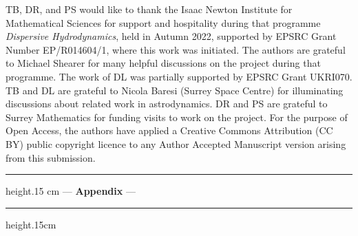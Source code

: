\documentclass[10pt]{article}
\begin{document}
TB, DR, and PS would like to thank the Isaac Newton Institute for Mathematical Sciences for support and hospitality during that programme {\it Dispersive Hydrodynamics}, held in Autumn 2022, supported by EPSRC Grant Number EP/R014604/1, where this work was initiated. The authors are grateful to Michael Shearer for many helpful discussions on the project during that programme.  The work of DL was partially supported by EPSRC Grant UKRI070. TB and DL are grateful to Nicola Baresi (Surrey Space Centre)  for illuminating discussions about related work in astrodynamics. DR and PS are grateful to Surrey Mathematics for funding visits to work on the project. For the purpose of Open Access, the authors have applied a Creative Commons Attribution (CC BY) public copyright licence to any Author Accepted Manuscript version arising from this submission.

\newpage
\begin{center}
\hrule height.15 cm
\vspace{.2cm}
--- {\Large\bf Appendix} ---
\vspace{.2cm}
\hrule height.15cm
\end{center}
\vspace{.25cm}
\end{document}
